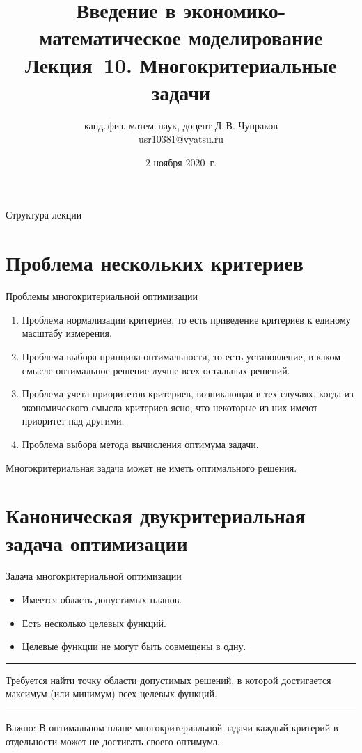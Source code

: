 \documentclass[unicode,11pt,notheorems,xcolor=table]{beamer}
\author[Д.\,В. Чупраков]{канд.\,физ.-матем.\,наук, доцент Д.\,В. Чупраков\\[6pt] usr10381@vyatsu.ru}
\institute[ВятГУ]{ФГБОУ ВО Вятский государственный университет}
\title[Лекция~10. Многокритериальные задачи]{
	Введение в экономико-математическое моделирование\\[12pt]
	Лекция~10. Многокритериальные задачи}
\date{2 ноября 2020~г.}
\begin{document}
\maketitle

\begin{frame}{Структура лекции}
	\tableofcontents
\end{frame}

\section{Проблема нескольких критериев}

\begin{frame}{Проблемы многокритериальной оптимизации}{}
\begin{enumerate}
    \item Проблема нормализации критериев, то  есть приведение критериев к единому масштабу измерения.
    \item Проблема выбора принципа оптимальности, то есть установление, в каком смысле оптимальное решение лучше всех остальных решений.
    \item Проблема учета приоритетов критериев, возникающая в тех случаях, когда из экономического смысла критериев ясно, что некоторые из них имеют приоритет над другими. 
    \item Проблема выбора метода вычисления оптимума задачи. 
\end{enumerate}
\begin{alertblock}{}
    Многокритериальная задача может не иметь оптимального решения.
\end{alertblock}
\end{frame}

 \section{Каноническая двукритериальная задача оптимизации}


\begin{frame}{Задача многокритериальной оптимизации}
    \begin{itemize}
        \item Имеется область допустимых планов.
        \item Есть несколько целевых функций.
        \item Целевые функции не могут быть совмещены в одну.
    \end{itemize}
    \medskip
    \hrule
    \medskip
    Требуется найти точку области допустимых решений, в которой достигается максимум (или минимум) всех целевых функций. 

    \medskip
    \hrule
    \medskip
    \alert{Важно:}
    В оптимальном плане многокритериальной задачи каждый критерий в отдельности может не достигать своего оптимума.

\end{frame}
\end{document}
